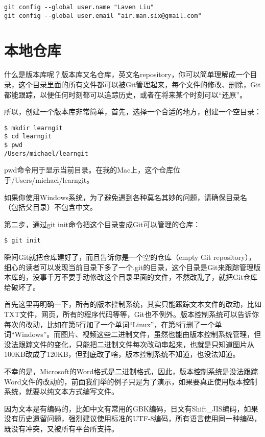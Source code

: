 \begin{verbatim}
git config --global user.name "Laven Liu"
git config --global user.email "air.man.six@gmail.com"
\end{verbatim}

\section{本地仓库}

什么是版本库呢？版本库又名仓库，英文名repository，你可以简单理解成一个目录，这个目录里面的所有文件都可以被Git管理起来，每个文件的修改、删除，Git都能跟踪，以便任何时刻都可以追踪历史，或者在将来某个时刻可以“还原”。

所以，创建一个版本库非常简单，首先，选择一个合适的地方，创建一个空目录：

\begin{verbatim}
$ mkdir learngit
$ cd learngit
$ pwd
/Users/michael/learngit
\end{verbatim}

pwd命令用于显示当前目录。在我的Mac上，这个仓库位于/Users/michael/learngit。

如果你使用Windows系统，为了避免遇到各种莫名其妙的问题，请确保目录名（包括父目录）不包含中文。

第二步，通过git init命令把这个目录变成Git可以管理的仓库：

\begin{verbatim}
$ git init

\end{verbatim}

瞬间Git就把仓库建好了，而且告诉你是一个空的仓库（empty Git repository），细心的读者可以发现当前目录下多了一个.git的目录，这个目录是Git来跟踪管理版本库的，没事千万不要手动修改这个目录里面的文件，不然改乱了，就把Git仓库给破坏了。

首先这里再明确一下，所有的版本控制系统，其实只能跟踪文本文件的改动，比如TXT文件，网页，所有的程序代码等等，Git也不例外。版本控制系统可以告诉你每次的改动，比如在第5行加了一个单词“Linux”，在第8行删了一个单词“Windows”。而图片、视频这些二进制文件，虽然也能由版本控制系统管理，但没法跟踪文件的变化，只能把二进制文件每次改动串起来，也就是只知道图片从100KB改成了120KB，但到底改了啥，版本控制系统不知道，也没法知道。

不幸的是，Microsoft的Word格式是二进制格式，因此，版本控制系统是没法跟踪Word文件的改动的，前面我们举的例子只是为了演示，如果要真正使用版本控制系统，就要以纯文本方式编写文件。

因为文本是有编码的，比如中文有常用的GBK编码，日文有Shift\_JIS编码，如果没有历史遗留问题，强烈建议使用标准的UTF-8编码，所有语言使用同一种编码，既没有冲突，又被所有平台所支持。

